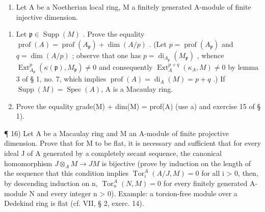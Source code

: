 \begin{enumerate}
\def\labelenumi{\arabic{enumi})}
\setcounter{enumi}{14}
\tightlist
\item
  Let A be a Noetherian local ring, M a finitely generated A-module of finite injective dimension.
\end{enumerate}

\begin{enumerate}
\def\labelenumi{\alph{enumi})}
\item
  Let \(\mathfrak{p} \in \operatorname{Supp}(M)\) . Prove the equality \(\operatorname{prof}(A) = \operatorname{prof}(A_{\mathfrak{p}}) + \dim(A/p)\) . (Let \(p = \operatorname{prof}(A_{\mathfrak{p}})\) and \(q = \dim(A/p)\) ; observe that one has \(p = \operatorname{di}_{A_{\mathfrak{p}}} (M_{\mathfrak{p}})\) , whence \(\operatorname{Ext}_{A_{\mathfrak{p}}}^{p}(\kappa(\mathfrak{p}), M_{\mathfrak{p}}) \neq 0\) and consequently \(\operatorname{Ext}_{A}^{p+q}(\kappa_A, M) \neq 0\) by lemma 3 of § 1, no. 7, which implies \(\operatorname{prof}(A) = \operatorname{di}_A(M) = p + q\) .) If \(\operatorname{Supp}(M) = \operatorname{Spec}(A)\), A is a Macaulay ring.
\item
  Prove the equality grade(M) + dim(M) = prof(A) (use a) and exercise 15 of § 1).
\end{enumerate}

¶ 16) Let A be a Macaulay ring and M an A-module of finite projective dimension. Prove that for M to be flat, it is necessary and sufficient that for every ideal J of A generated by a completely secant sequence, the canonical homomorphism \(J \otimes_{A} M \to JM\) is bijective (prove by induction on the length of the sequence that this condition implies \(\operatorname{Tor}_{i}^{A}(A/J, M) = 0\) for all i \textgreater{} 0, then, by descending induction on n, \(\operatorname{Tor}_{n}^{A}(N, M) = 0\) for every finitely generated A-module N and every integer n \textgreater{} 0). Example: a torsion-free module over a Dedekind ring is flat (cf. VII, § 2, exerc. 14).
